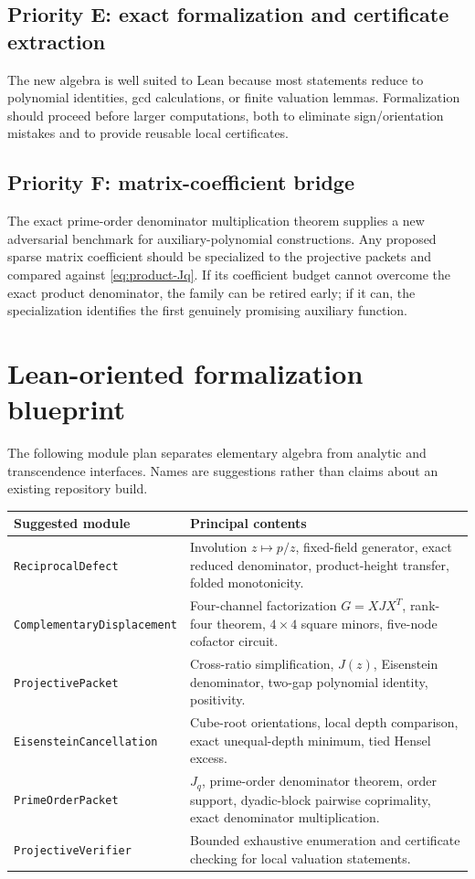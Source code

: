 \documentclass[11pt]{article}
\theoremstyle{definition}
\theoremstyle{remark}
\begin{document}
\subsection{Priority E: exact formalization and certificate extraction}

The new algebra is well suited to Lean because most statements reduce to polynomial identities, gcd calculations, or finite valuation lemmas.  Formalization should proceed before larger computations, both to eliminate sign/orientation mistakes and to provide reusable local certificates.

\subsection{Priority F: matrix-coefficient bridge}

The exact prime-order denominator multiplication theorem supplies a new adversarial benchmark for auxiliary-polynomial constructions.  Any proposed sparse matrix coefficient should be specialized to the projective packets and compared against \eqref{eq:product-Jq}.  If its coefficient budget cannot overcome the exact product denominator, the family can be retired early; if it can, the specialization identifies the first genuinely promising auxiliary function.

\section{Lean-oriented formalization blueprint}
\label{sec:lean}

The following module plan separates elementary algebra from analytic and transcendence interfaces.  Names are suggestions rather than claims about an existing repository build.

\begin{center}
\begin{tabularx}{0.98\textwidth}{@{}p{}X@{}}
\toprule
Suggested module & Principal contents\\
\midrule
\texttt{ReciprocalDefect} & Involution $z\mapsto p/z$, fixed-field generator, exact reduced denominator, product-height transfer, folded monotonicity.\\
\texttt{ComplementaryDisplacement} & Four-channel factorization $G=XJX^T$, rank-four theorem, $4\times4$ square minors, five-node cofactor circuit.\\
\texttt{ProjectivePacket} & Cross-ratio simplification, $J(z)$, Eisenstein denominator, two-gap polynomial identity, positivity.\\
\texttt{EisensteinCancellation} & Cube-root orientations, local depth comparison, exact unequal-depth minimum, tied Hensel excess.\\
\texttt{PrimeOrderPacket} & $J_q$, prime-order denominator theorem, order support, dyadic-block pairwise coprimality, exact denominator multiplication.\\
\texttt{ProjectiveVerifier} & Bounded exhaustive enumeration and certificate checking for local valuation statements.\\
\bottomrule
\end{tabularx}
\end{center}
\end{document}

